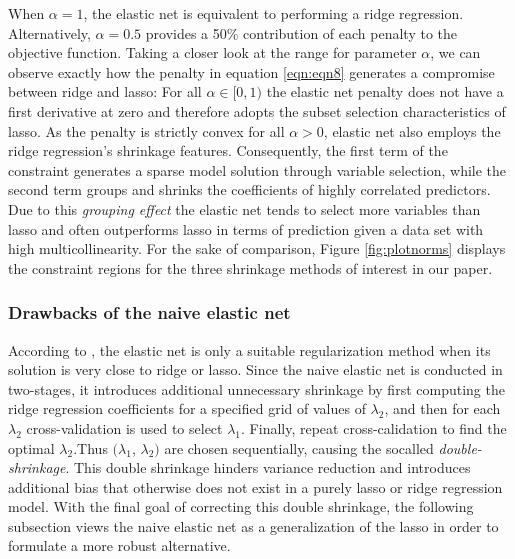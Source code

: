 \noindent When $\alpha = 1$, the elastic net is equivalent to performing a ridge regression. Alternatively, $\alpha = 0.5$ provides a 50\% contribution of each penalty to the objective function. Taking a closer look at the range for parameter $\alpha$, we can observe exactly how the penalty in equation \eqref{eqn:eqn8} generates a compromise between ridge and lasso: For all $\alpha\in[0, 1)$ the elastic net penalty does not have a first derivative at zero and therefore adopts the subset selection characteristics of lasso. As the penalty is strictly convex for all $\alpha>0$, elastic net also employs the ridge regression's shrinkage features. Consequently, the first term of the constraint generates a sparse model solution through variable selection, while the second term groups and shrinks the coefficients of highly correlated predictors. Due to this \emph{grouping effect} the elastic net tends to select more variables than lasso and often outperforms lasso in terms of prediction given a data set with high multicollinearity. For the sake of comparison, Figure \ref{fig:plotnorms} displays the constraint regions for the three shrinkage methods of interest in our paper. 

\subsubsection{Drawbacks of the naive elastic net}

\noindent According to \cite{zou2005regularization}, the elastic net is only a suitable regularization method when its solution is very close to ridge or lasso. Since the naive elastic net is conducted in two-stages, it introduces additional unnecessary shrinkage by first computing the ridge regression coefficients  for a specified grid of values of $\lambda_2$, and then for each $\lambda_2$ cross-validation is used to select $\lambda_1$. Finally, repeat cross-calidation to find the optimal $\lambda_2. $Thus $(\lambda_1$, $\lambda_2)$ are chosen sequentially, causing the socalled \emph{double-shrinkage}.
This double shrinkage hinders variance reduction and introduces additional bias that otherwise does not exist in a purely lasso or ridge regression model. With the final goal of correcting this double shrinkage, the following
subsection views the naive elastic net as a generalization of the lasso in order to formulate a more robust alternative.

